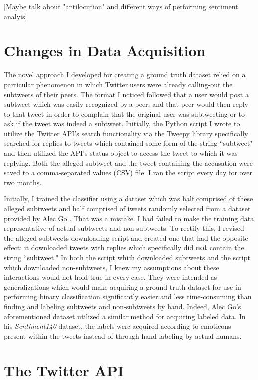 \documentclass[11pt, twoside, reqno]{book}
\begin{document}
[Maybe talk about "antilocution" and different ways of performing sentiment analyis]

\section{Changes in Data Acquisition}
\label{changes_in_data}

The novel approach I developed for creating a ground truth dataset relied on a particular phenomenon in which Twitter users were already calling-out the subtweets of their peers. The format I noticed followed that a user would post a subtweet which was easily recognized by a peer, and that peer would then reply to that tweet in order to complain that the original user was subtweeting or to ask if the tweet was indeed a subtweet. Initially, the Python script I wrote to utilize the Twitter API's search functionality via the Tweepy library specifically searched for replies to tweets which contained some form of the string ``subtweet" and then utilized the API's status object to access the tweet to which it was replying. Both the alleged subtweet and the tweet containing the accusation were saved to a comma-separated values (CSV) file. I ran the script every day for over two months.

Initially, I trained the classifier using a dataset which was half comprised of these alleged subtweets and half comprised of tweets randomly selected from a dataset provided by Alec Go \cite{go_dataset}. That was a mistake. I had failed to make the training data representative of actual subtweets and non-subtweets. To rectify this, I revised the alleged subtweets downloading script and created one that had the opposite effect: it downloaded tweets with replies which specifically did \textbf{not} contain the string ``subtweet." In both the script which downloaded subtweets and the script which downloaded non-subtweets, I knew my assumptions about these interactions would not hold true in every case. They were intended as generalizations which would make acquiring a ground truth dataset for use in performing binary classification significantly easier and less time-consuming than finding and labeling subtweets and non-subtweets by hand. Indeed, Alec Go's aforementioned dataset utilized a similar method for acquiring labeled data. In his \textit{Sentiment140} dataset, the labels were acquired according to emoticons present within the tweets instead of through hand-labeling by actual humans. 

\section{The Twitter API}
\label{twitter_api}
\end{document}
